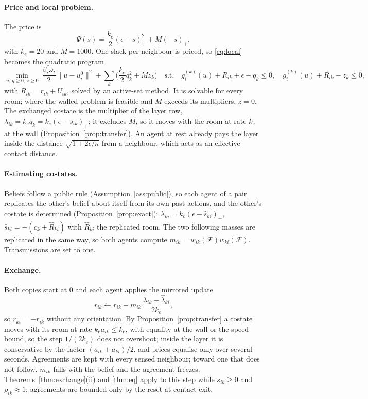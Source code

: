 \documentclass[11pt]{article}
\theoremstyle{definition}
\theoremstyle{remark}
\newcommand{\F}{\mathcal{F}}
\begin{document}
\paragraph{Price and local problem.} The price is
\[
\Psi(s)=\frac{k_e}2(\epsilon-s)_+^2+M(-s)_+,
\]
with $k_e=20$ and $M=1000$. One slack per neighbour is priced, so \eqref{eq:local} becomes the quadratic program
\[
\min_{u,\,q\ge0,\,z\ge0}\ \frac{\beta_i\omega_i}2\|u-u_i^0\|^2+\sum_k\Big(\frac{k_e}2q_k^2+Mz_k\Big)\quad\text{s.t.}\quad g_i^{(k)}(u)+R_{ik}+\epsilon-q_k\le0,\quad g_i^{(k)}(u)+R_{ik}-z_k\le0,
\]
with $R_{ik}=r_{ik}+U_{ik}$, solved by an active-set method. It is solvable for every room; where the walled problem is feasible and $M$ exceeds its multipliers, $z=0$. The exchanged costate is the multiplier of the layer row, $\lambda_{ik}=k_eq_k=k_e(\epsilon-s_{ik})_+$; it excludes $M$, so it moves with the room at rate $k_e$ at the wall (Proposition~\ref{prop:transfer}). An agent at rest already pays the layer inside the distance $\sqrt{1+2\epsilon/\kappa}$ from a neighbour, which acts as an effective contact distance.

\paragraph{Estimating costates.} Beliefs follow a public rule (Assumption~\ref{ass:public}), so each agent of a pair replicates the other's belief about itself from its own past actions, and the other's costate is determined (Proposition~\ref{prop:exact}): $\hat\lambda_{ki}=k_e(\epsilon-\hat s_{ki})_+$, $\hat s_{ki}=-(c_k+\hat R_{ki})$ with $\hat R_{ki}$ the replicated room. The two following masses are replicated in the same way, so both agents compute $m_{ik}=w_{ik}(\F)w_{ki}(\F)$. Transmissions are set to one.

\paragraph{Exchange.} Both copies start at $0$ and each agent applies the mirrored update
\[
r_{ik}\leftarrow r_{ik}-m_{ik}\,\frac{\lambda_{ik}-\hat\lambda_{ki}}{2k_e},
\]
so $r_{ki}=-r_{ik}$ without any orientation. By Proposition~\ref{prop:transfer} a costate moves with its room at rate $k_ea_{ik}\le k_e$, with equality at the wall or the speed bound, so the step $1/(2k_e)$ does not overshoot; inside the layer it is conservative by the factor $(a_{ik}+a_{ki})/2$, and prices equalise only over several seconds. Agreements are kept with every sensed neighbour; toward one that does not follow, $m_{ik}$ falls with the belief and the agreement freezes. Theorems~\ref{thm:exchange}(ii) and \ref{thm:eq} apply to this step while $s_{ik}\ge0$ and $\rho_{ik}\approx1$; agreements are bounded only by the reset at contact exit.
\end{document}
